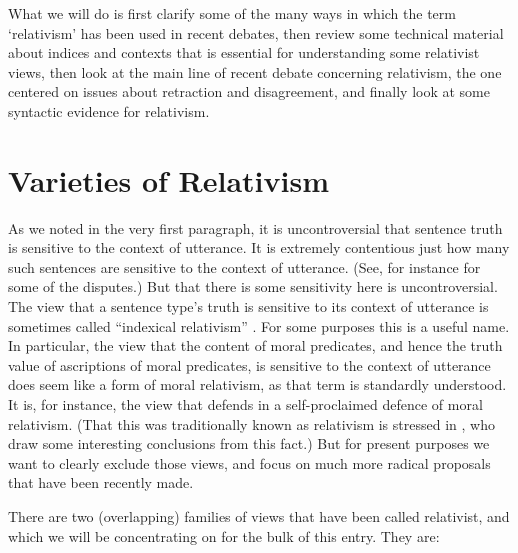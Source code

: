 What we will do is first clarify some of the many ways in which the term `relativism' has been used in recent debates, then review some technical material about indices and contexts that is essential for understanding some relativist views, then look at the main line of recent debate concerning relativism, the one centered on issues about retraction and disagreement, and finally look at some syntactic evidence for relativism.

\section{Varieties of Relativism}
\label{varietiesofrelativism}

As we noted in the very first paragraph, it is uncontroversial that sentence truth is sensitive to the context of utterance. It is extremely contentious just how many such sentences are sensitive to the context of utterance. (See, for instance  \citet{DeRose2009, HarmanThomson1996, Cappelen2005} for some of the disputes.) But that there is some sensitivity here is uncontroversial. The view that a sentence type's truth is sensitive to its context of utterance is sometimes called ``indexical relativism''  \citet{Kolbel2004a, Einheuser2008}. For some purposes this is a useful name. In particular, the view that the content of moral predicates, and hence the truth value of ascriptions of moral predicates, is sensitive to the context of utterance does seem like a form of moral relativism, as that term is standardly understood. It is, for instance, the view that  \citet{Harman1975} defends in a self-proclaimed defence of moral relativism. (That this was traditionally known as relativism is stressed in  \citet{CappelenHuvenes2014}, who draw some interesting conclusions from this fact.) But for present purposes we want to clearly exclude those views, and focus on much more radical proposals that have been recently made.

There are two (overlapping) families of views that have been called relativist, and which we will be concentrating on for the bulk of this entry. They are:

